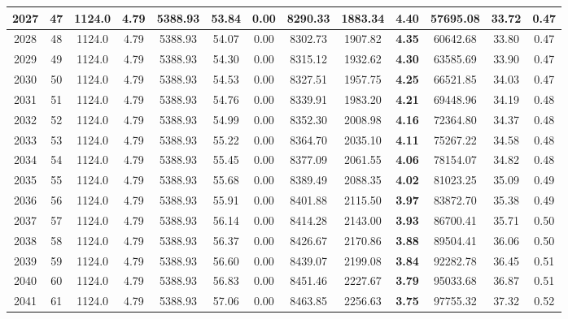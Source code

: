 {\begin{center}
\begin{tabular}[htb]{|c|c||c|c|c|c|c|c||c|c||c|c|c||}
\hline 
 2027 &  47 &  1124.0 &  4.79 &  5388.93 &  53.84 &  0.00 &  8290.33 &  1883.34 &  {\bf 4.40} &  57695.08 &  33.72 &  0.47 \\ 
\hline 
 2028 &  48 &  1124.0 &  4.79 &  5388.93 &  54.07 &  0.00 &  8302.73 &  1907.82 &  {\bf 4.35} &  60642.68 &  33.80 &  0.47 \\ 
\hline 
 2029 &  49 &  1124.0 &  4.79 &  5388.93 &  54.30 &  0.00 &  8315.12 &  1932.62 &  {\bf 4.30} &  63585.69 &  33.90 &  0.47 \\ 
\hline 
 2030 &  50 &  1124.0 &  4.79 &  5388.93 &  54.53 &  0.00 &  8327.51 &  1957.75 &  {\bf 4.25} &  66521.85 &  34.03 &  0.47 \\ 
\hline 
 2031 &  51 &  1124.0 &  4.79 &  5388.93 &  54.76 &  0.00 &  8339.91 &  1983.20 &  {\bf 4.21} &  69448.96 &  34.19 &  0.48 \\ 
\hline 
 2032 &  52 &  1124.0 &  4.79 &  5388.93 &  54.99 &  0.00 &  8352.30 &  2008.98 &  {\bf 4.16} &  72364.80 &  34.37 &  0.48 \\ 
\hline 
 2033 &  53 &  1124.0 &  4.79 &  5388.93 &  55.22 &  0.00 &  8364.70 &  2035.10 &  {\bf 4.11} &  75267.22 &  34.58 &  0.48 \\ 
\hline 
 2034 &  54 &  1124.0 &  4.79 &  5388.93 &  55.45 &  0.00 &  8377.09 &  2061.55 &  {\bf 4.06} &  78154.07 &  34.82 &  0.48 \\ 
\hline 
 2035 &  55 &  1124.0 &  4.79 &  5388.93 &  55.68 &  0.00 &  8389.49 &  2088.35 &  {\bf 4.02} &  81023.25 &  35.09 &  0.49 \\ 
\hline 
 2036 &  56 &  1124.0 &  4.79 &  5388.93 &  55.91 &  0.00 &  8401.88 &  2115.50 &  {\bf 3.97} &  83872.70 &  35.38 &  0.49 \\ 
\hline 
 2037 &  57 &  1124.0 &  4.79 &  5388.93 &  56.14 &  0.00 &  8414.28 &  2143.00 &  {\bf 3.93} &  86700.41 &  35.71 &  0.50 \\ 
\hline 
 2038 &  58 &  1124.0 &  4.79 &  5388.93 &  56.37 &  0.00 &  8426.67 &  2170.86 &  {\bf 3.88} &  89504.41 &  36.06 &  0.50 \\ 
\hline 
 2039 &  59 &  1124.0 &  4.79 &  5388.93 &  56.60 &  0.00 &  8439.07 &  2199.08 &  {\bf 3.84} &  92282.78 &  36.45 &  0.51 \\ 
\hline 
 2040 &  60 &  1124.0 &  4.79 &  5388.93 &  56.83 &  0.00 &  8451.46 &  2227.67 &  {\bf 3.79} &  95033.68 &  36.87 &  0.51 \\ 
\hline 
 2041 &  61 &  1124.0 &  4.79 &  5388.93 &  57.06 &  0.00 &  8463.85 &  2256.63 &  {\bf 3.75} &  97755.32 &  37.32 &  0.52 \\ 

\end{tabular}
\end{center}}
